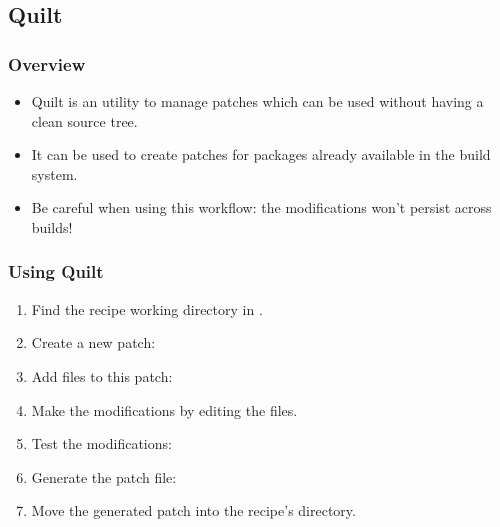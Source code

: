 \subsection{Quilt}

\begin{frame}
  \frametitle{Overview}
  \begin{itemize}
    \item Quilt is an utility to manage patches which can be used
      without having a clean source tree.
    \item It can be used to create patches for packages already
      available in the build system.
    \item Be careful when using this workflow: the modifications won't
      persist across builds!
  \end{itemize}
\end{frame}

\begin{frame}
  \frametitle{Using Quilt}
  \begin{enumerate}
    \item Find the recipe working directory in
      .
    \item Create a new  patch:
    \item Add files to this patch: 
    \item Make the modifications by editing the files.
    \item Test the modifications:
    \item Generate the patch file: 
    \item Move the generated patch into the recipe's directory.
  \end{enumerate}
\end{frame}
